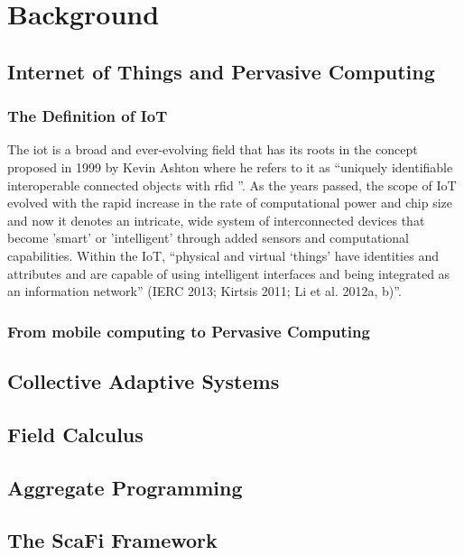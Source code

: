 
\chapter{Background}
\label{chap:background}

\section{Internet of Things and Pervasive Computing}

\subsection{The Definition of IoT}
The \ac{iot} is a broad and ever-evolving field that has its roots in the concept proposed in 1999 by Kevin Ashton where he refers to it as ``uniquely identifiable
interoperable connected objects with \ac{rfid} ''. As the years passed, the scope of IoT evolved with the rapid increase in the rate of computational power and
chip size and now it denotes an intricate, wide system of interconnected devices that become 'smart' or 'intelligent' through added sensors and computational capabilities.
Within the IoT, ``physical and virtual ‘things’ have identities and attributes and are capable of using intelligent interfaces and being integrated as an information network” (IERC 2013; Kirtsis 2011; Li et al.
2012a, b)''.

\subsection{From mobile computing to Pervasive Computing}

\section{Collective Adaptive Systems}

\section{Field Calculus}

\section{Aggregate Programming}

\section{The ScaFi Framework}

